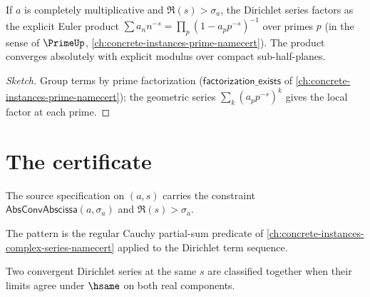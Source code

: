 \begin{theorem}
\label{thm:euler-product}
If \(a\) is completely multiplicative and \(\Re(s) > \sigma_a\), the Dirichlet series factors as the explicit Euler product \(\sum a_n n^{-s} = \prod_p (1 - a_p p^{-s})^{-1}\) over primes \(p\) (in the sense of \(\PrimeUp\), \autoref{ch:concrete-instances-prime-namecert}). The product converges absolutely with explicit modulus over compact sub-half-planes.
\end{theorem}
\begin{proof}[Sketch]
Group terms by prime factorization (\(\mathsf{factorization\_exists}\) of \autoref{ch:concrete-instances-prime-namecert}); the geometric series \(\sum_{k} (a_p p^{-s})^k\) gives the local factor at each prime.
\end{proof}

\section{The certificate}

\begin{definition}
\label{def:dir-source-spec}
The source specification on \((a, s)\) carries the constraint \(\mathsf{AbsConvAbscissa}(a, \sigma_a)\) and \(\Re(s) > \sigma_a\).
\end{definition}

\begin{definition}
\label{def:dir-pattern-spec}
The pattern is the regular Cauchy partial-sum predicate of \autoref{ch:concrete-instances-complex-series-namecert} applied to the Dirichlet term sequence.
\end{definition}

\begin{definition}
\label{def:dir-classifier-spec}
Two convergent Dirichlet series at the same \(s\) are classified together when their limits agree under \(\hsame\) on both real components.
\end{definition}

